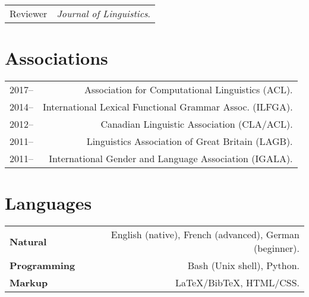 \documentclass[11pt,a4paper,twoside]{article}
\makeatletter
\newenvironment{cvsection}{%
  \setlength{\extrarowheight}{0.70ex}
  \begin{longtable}[l]{@{} L R @{}}
}{%
  \end{longtable}
}
\makeatother
\begin{document}
\begin{cvsection}
Reviewer	&	\textit{Journal of Linguistics}.
\end{cvsection}

\section*{Associations}

\begin{cvsection}
  2017--	& Association for Computational Linguistics (ACL).\\
  2014--  & International Lexical Functional Grammar Assoc. (ILFGA).\\
  2012-- 	& Canadian Linguistic Association (CLA\slash ACL).\\
  2011-- 	& Linguistics Association of Great Britain (LAGB).\\
  2011-- 	& International Gender and Language Association (IGALA).\\
\end{cvsection}
\newpage
\section*{Languages}

\begin{cvsection}
  \textbf{Natural}      & English (native), French (advanced), German (beginner). \\
  \textbf{Programming}  & Bash (Unix shell), Python. \\
  \textbf{Markup}       & \LaTeX\slash Bib\TeX, HTML\slash CSS.
\end{cvsection}
\end{document}
